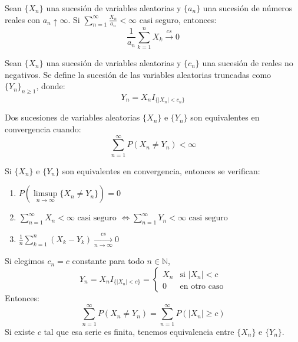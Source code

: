 \begin{lemma}[Kronecker]
    Sean $\{X_n\}$ una sucesión de variables aleatorias y $\{a_n\}$ una sucesión de números reales con $a_n \uparrow \infty$.
    Si $\sum_{n=1}^\infty \frac{X_n}{a_n} < \infty$ casi seguro, entonces:
    $$\frac{1}{a_n} \sum_{k=1}^n X_k \xrightarrow{cs} 0$$
\end{lemma}

\begin{definition}
    Sean $\{X_n\}$ una sucesión de variables aleatorias y $\{c_n\}$ una sucesión de reales no negativos.
    Se define la sucesión de las variables aleatorias truncadas como $\{Y_n\}_{n \geq 1}$, donde:
    $$Y_n = X_n I_{\{|X_n| < c_n\}}$$
\end{definition}

\begin{definition}
    Dos sucesiones de variables aleatorias $\{X_n\}$ e $\{Y_n\}$ son equivalentes en convergencia cuando:
    $$\sum_{n=1}^\infty P(X_n \neq Y_n) < \infty$$
\end{definition}

\begin{theorem}
    Si $\{X_n\}$ e $\{Y_n\}$ son equivalentes en convergencia, entonces se verifican:
    \begin{enumerate}
        \item $P(\limsup\limits_{n \to \infty} \{X_n \neq Y_n\}) = 0$
        \item $\sum_{n=1}^\infty X_n < \infty \text{ casi seguro } \Leftrightarrow \sum_{n=1}^\infty Y_n < \infty \text{ casi seguro}$
        \item $\frac{1}{n} \sum_{k=1}^n (X_k - Y_k) \xrightarrow[n \to \infty]{cs} 0$
    \end{enumerate}
\end{theorem}

\begin{remark}
    Si elegimos $c_n = c$ constante para todo $n \in \mathbb{N}$,
    $$Y_n = X_n I_{\{|X_n| < c\}} = \begin{cases}
            X_n & \text{si } |X_n| < c \\
            0   & \text{en otro caso}
        \end{cases}$$
    Entonces:
    $$\sum_{n=1}^\infty P(X_n \neq Y_n) = \sum_{n=1}^\infty P(|X_n| \geq c)$$
    Si existe $c$ tal que esa serie es finita, tenemos equivalencia entre $\{X_n\}$ e $\{Y_n\}$.
\end{remark}

